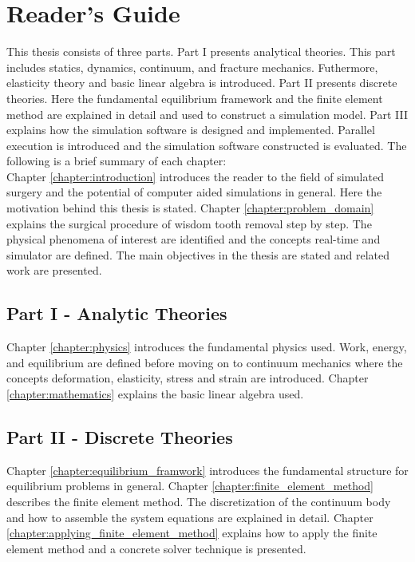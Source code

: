 
\chapter*{Reader's Guide}
This thesis consists of three parts. Part I presents analytical
theories. This part includes statics, dynamics, continuum, and fracture
mechanics. Futhermore, elasticity theory and basic linear algebra is
introduced. Part II presents discrete theories. Here the fundamental
equilibrium framework and the finite element method are explained in
detail and used to construct a simulation model. Part III explains how
the simulation software is designed and implemented. Parallel
execution is introduced and the simulation software constructed is
evaluated.
%
The following is a brief summary of each chapter: \\ 

Chapter \ref{chapter:introduction} introduces the reader to the field
of simulated surgery and the potential of computer aided simulations
in general. Here the motivation behind this thesis is stated.
%
Chapter \ref{chapter:problem_domain} explains the surgical procedure
of wisdom tooth removal step by step. The physical phenomena of
interest are identified and the concepts real-time and simulator are
defined. The main objectives in the thesis are stated and related work
are presented.

\section*{Part I - Analytic Theories}
Chapter \ref{chapter:physics} introduces the fundamental physics
used. Work, energy, and equilibrium are defined before moving on to
continuum mechanics where the concepts deformation, elasticity,
stress and strain are introduced.
%
Chapter \ref{chapter:mathematics} explains the basic linear algebra
used.

\section*{Part II - Discrete Theories}
Chapter \ref{chapter:equilibrium_framwork} introduces the fundamental
structure for equilibrium problems in general.
%
Chapter \ref{chapter:finite_element_method} describes the finite
element method. The discretization of the continuum body and how
to assemble the system equations are explained in detail.
%
Chapter \ref{chapter:applying_finite_element_method} explains how to
apply the finite element method and a concrete solver technique is
presented.

